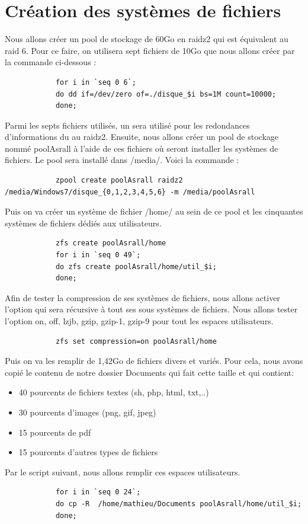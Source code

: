 \documentclass[a4paper]{report}
\begin{document}
	\section{Création des systèmes de fichiers}	
	 Nous allons créer un pool de stockage de 60Go en raidz2 qui est équivalent au raid 6. Pour ce faire, on utilisera sept fichiers de 10Go que nous allons créer par la commande ci-dessous :
		\begin{lstlisting}
			for i in `seq 0 6`;
			do dd if=/dev/zero of=./disque_$i bs=1M count=10000;
			done;
		\end{lstlisting}
	Parmi les septs fichiers utilisés, un sera utilisé pour les redondances d'informations du au raidz2. Ensuite, nous allons créer un pool de stockage nommé poolAsrall à l'aide de ces fichiers où seront installer les systèmes de fichiers. Le pool sera installé dans /media/. Voici la commande :
		\begin{lstlisting}
			zpool create poolAsrall raidz2 /media/Windows7/disque_{0,1,2,3,4,5,6} -m /media/poolAsrall
		\end{lstlisting}
	Puis on va créer un système de fichier /home/ au sein de ce pool et les cinquantes systèmes de fichiers dédiés aux utilisateurs.
		\begin{lstlisting}
			zfs create poolAsrall/home
			for i in `seq 0 49`;
			do zfs create poolAsrall/home/util_$i;
			done;
		\end{lstlisting}
	Afin de tester la compression de ses systèmes de fichiers, nous allons activer l'option qui sera récursive à tout ses sous systèmes de fichiers. Nous allons tester l'option on, off, lzjb, gzip, gzip-1, gzip-9 pour tout les espaces utilisateurs.
		\begin{lstlisting}
			zfs set compression=on poolAsrall/home
		\end{lstlisting}
	Puis on va les remplir de 1,42Go de fichiers divers et variés. Pour cela, nous avons copié le contenu de notre dossier Documents qui fait cette taille et qui contient:
		\begin{itemize}
			\item 40 pourcents de fichiers textes (sh, php, html, txt,..)
			\item 30 pourcents d'images (png, gif, jpeg)
			\item 15 pourcents de pdf
			\item 15 pourcents d'autres types de fichiers
		\end{itemize}
	Par le script suivant, nous allons remplir ces espaces utilisateurs.
		\begin{lstlisting}
			for i in `seq 0 24`;
			do cp -R  /home/mathieu/Documents poolAsrall/home/util_$i;
			done;
		\end{lstlisting}
\end{document}

